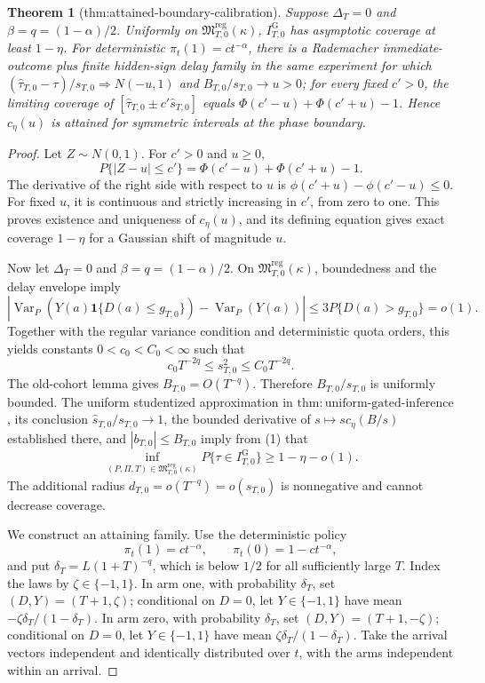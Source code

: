 \documentclass{article}
\newtheorem{theorem}{Theorem}
\begin{document}
\begin{theorem}[thm:attained-boundary-calibration]\label{thm:attained-boundary-calibration}
Suppose \(\Delta_T=0\) and \(\beta=q=(1-\alpha)/2\). Uniformly on \(\mathfrak M_{T,0}^{\mathrm{reg}}(\kappa)\), \(I_{T,0}^{\mathrm G}\) has asymptotic coverage at least \(1-\eta\). For deterministic \(\pi_t(1)=ct^{-\alpha}\), there is a Rademacher immediate-outcome plus finite hidden-sign delay family in the same experiment for which \((\widehat\tau_{T,0}-\tau)/s_{T,0}\Rightarrow N(-u,1)\) and \(B_{T,0}/s_{T,0}\to u>0\); for every fixed \(c'>0\), the limiting coverage of \([\widehat\tau_{T,0}\pm c'\widehat s_{T,0}]\) equals \(\Phi(c'-u)+\Phi(c'+u)-1\). Hence \(c_\eta(u)\) is attained for symmetric intervals at the phase boundary.
\end{theorem}
\begin{proof}
Let \(Z\sim N(0,1)\).  For \(c'>0\) and \(u\geq0\),
\[
 P\{|Z-u|\leq c'\}=\Phi(c'-u)+\Phi(c'+u)-1. \tag{1}
\]
The derivative of the right side with respect to \(u\) is \(\phi(c'+u)-\phi(c'-u)\leq0\).  For fixed \(u\), it is continuous and strictly increasing in \(c'\), from zero to one.  This proves existence and uniqueness of \(c_\eta(u)\), and its defining equation gives exact coverage \(1-\eta\) for a Gaussian shift of magnitude \(u\).

Now let \(\Delta_T=0\) and \(\beta=q=(1-\alpha)/2\).  On \(\mathfrak M_{T,0}^{\mathrm{reg}}(\kappa)\), boundedness and the delay envelope imply
\[
 |\operatorname{Var}_P(Y(a)\mathbf 1\{D(a)\leq g_{T,0}\})
 -\operatorname{Var}_P(Y(a))|
 \leq3P\{D(a)>g_{T,0}\}=o(1). \tag{2}
\]
Together with the regular variance condition and deterministic quota orders, this yields constants \(0<c_0<C_0<\infty\) such that
\[
 c_0T^{-2q}\leq s_{T,0}^2\leq C_0T^{-2q}. \tag{3}
\]
The old-cohort lemma gives \(B_{T,0}=O(T^{-q})\).  Therefore \(B_{T,0}/s_{T,0}\) is uniformly bounded.  The uniform studentized approximation in \(\mathrm{thm:uniform\text{-}gated\text{-}inference}\), its conclusion \(\widehat s_{T,0}/s_{T,0}\to1\), the bounded derivative of \(s\mapsto s c_\eta(B/s)\) established there, and \(|b_{T,0}|\leq B_{T,0}\) imply from (1) that
\[
 \inf_{(P,\Pi,T)\in\mathfrak M_{T,0}^{\mathrm{reg}}(\kappa)}
 P\{\tau\in I_{T,0}^{\mathrm G}\}\geq1-\eta-o(1). \tag{4}
\]
The additional radius \(d_{T,0}=o(T^{-q})=o(s_{T,0})\) is nonnegative and cannot decrease coverage.

We construct an attaining family.  Use the deterministic policy
\[
 \pi_t(1)=ct^{-\alpha},\qquad \pi_t(0)=1-ct^{-\alpha}, \tag{5}
\]
and put \(\delta_T=L(1+T)^{-q}\), which is below \(1/2\) for all sufficiently large \(T\).  Index the laws by \(\zeta\in\{-1,1\}\).  In arm one, with probability \(\delta_T\), set \((D,Y)=(T+1,\zeta)\); conditional on \(D=0\), let \(Y\in\{-1,1\}\) have mean \(-\zeta\delta_T/(1-\delta_T)\).  In arm zero, with probability \(\delta_T\), set \((D,Y)=(T+1,-\zeta)\); conditional on \(D=0\), let \(Y\in\{-1,1\}\) have mean \(\zeta\delta_T/(1-\delta_T)\).  Take the arrival vectors independent and identically distributed over \(t\), with the arms independent within an arrival.


\end{proof}
\end{document}
